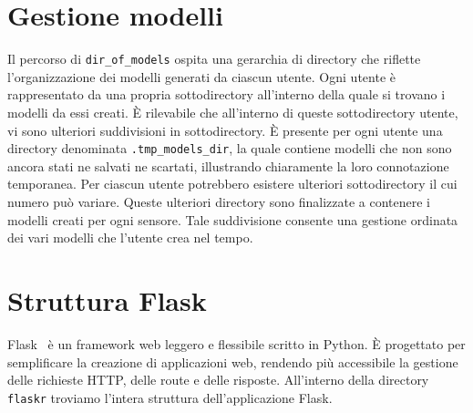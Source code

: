 \documentclass{rapportECL}
\begin{document}
\section{Gestione modelli}
Il percorso di \texttt{dir\_of\_models} ospita una gerarchia di directory che riflette l'organizzazione dei modelli generati da ciascun utente. 
Ogni utente è rappresentato da una propria sottodirectory all'interno della quale si trovano i modelli da essi creati. 
È rilevabile che all'interno di queste sottodirectory utente, vi sono ulteriori suddivisioni in sottodirectory. È presente per ogni utente
una directory denominata \texttt{.tmp\_models\_dir}, la quale contiene modelli che non sono ancora stati ne salvati ne scartati, illustrando chiaramente
la loro connotazione temporanea. Per ciascun utente potrebbero esistere ulteriori sottodirectory il cui numero può variare.
Queste ulteriori directory sono finalizzate a contenere i modelli creati per ogni sensore.
Tale suddivisione consente una gestione ordinata dei vari modelli che l'utente crea nel tempo.

\section{Struttura Flask}
Flask~\cite{flask} è un framework web leggero e flessibile scritto in Python. È progettato per semplificare la creazione di applicazioni web, 
rendendo più accessibile la gestione delle richieste HTTP, delle route e delle risposte.
All'interno della directory \texttt{flaskr} troviamo l'intera struttura dell'applicazione Flask.
\end{document}
